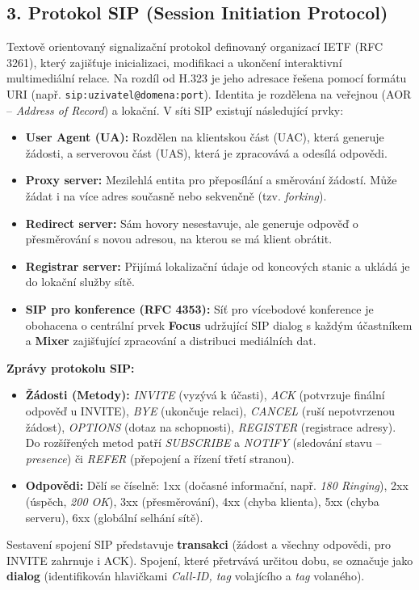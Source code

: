     \subsection*{3. Protokol SIP (Session Initiation Protocol)}
        Textově orientovaný signalizační protokol definovaný organizací IETF (RFC 3261), který zajišťuje inicializaci, modifikaci a ukončení interaktivní multimediální relace. Na rozdíl od H.323 je jeho adresace řešena pomocí formátu URI (např. \texttt{sip:uzivatel@domena:port}). Identita je rozdělena na veřejnou (AOR -- \textit{Address of Record}) a lokační. V síti SIP existují následující prvky:
        \begin{itemize}
            \item \textbf{User Agent (UA):} Rozdělen na klientskou část (UAC), která generuje žádosti, a serverovou část (UAS), která je zpracovává a odesílá odpovědi.
            \item \textbf{Proxy server:} Mezilehlá entita pro přeposílání a směrování žádostí. Může žádat i na více adres současně nebo sekvenčně (tzv. \textit{forking}).
            \item \textbf{Redirect server:} Sám hovory nesestavuje, ale generuje odpověď o přesměrování s novou adresou, na kterou se má klient obrátit.
            \item \textbf{Registrar server:} Přijímá lokalizační údaje od koncových stanic a ukládá je do lokační služby sítě.
            \item \textbf{SIP pro konference (RFC 4353):} Síť pro vícebodové konference je obohacena o centrální prvek \textbf{Focus} udržující SIP dialog s každým účastníkem a \textbf{Mixer} zajišťující zpracování a distribuci mediálních dat.
        \end{itemize}
        \textbf{Zprávy protokolu SIP:}
        \begin{itemize}
            \item \textbf{Žádosti (Metody):} \textit{INVITE} (vyzývá k účasti), \textit{ACK} (potvrzuje finální odpověď u INVITE), \textit{BYE} (ukončuje relaci), \textit{CANCEL} (ruší nepotvrzenou žádost), \textit{OPTIONS} (dotaz na schopnosti), \textit{REGISTER} (registrace adresy). Do rozšířených metod patří \textit{SUBSCRIBE} a \textit{NOTIFY} (sledování stavu -- \textit{presence}) či \textit{REFER} (přepojení a řízení třetí stranou).
            \item \textbf{Odpovědi:} Dělí se číselně: 1xx (dočasné informační, např. \textit{180 Ringing}), 2xx (úspěch, \textit{200 OK}), 3xx (přesměrování), 4xx (chyba klienta), 5xx (chyba serveru), 6xx (globální selhání sítě).
        \end{itemize}
        Sestavení spojení SIP představuje \textbf{transakci} (žádost a všechny odpovědi, pro INVITE zahrnuje i ACK). Spojení, které přetrvává určitou dobu, se označuje jako \textbf{dialog} (identifikován hlavičkami \textit{Call-ID, tag} volajícího a \textit{tag} volaného).
